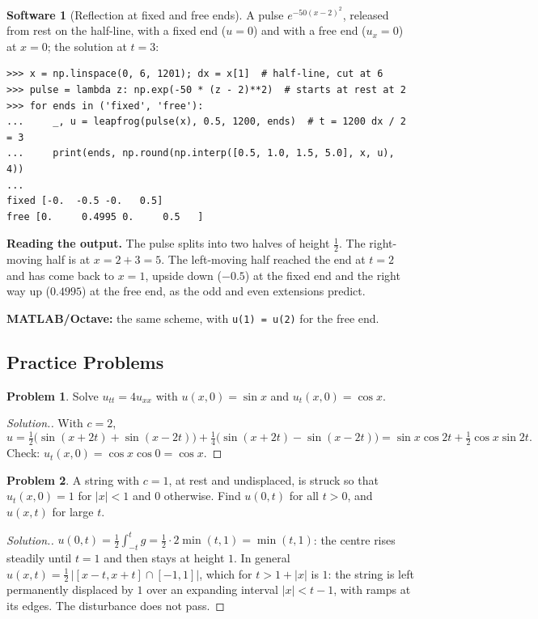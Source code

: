 \documentclass[11pt,a4paper]{article}
\numberwithin{equation}{section}
\theoremstyle{definition}
\newtheorem{software}[thm]{Software}
\newtheorem{problemx}{Problem}[subsection]
\newenvironment{problem}{\begin{problemx}}{\end{problemx}}
\newenvironment{solution}
  {\renewcommand{\qedsymbol}{}\begin{proof}[\textit{Solution}.]}
  {\end{proof}}
\begin{document}
\begin{software}[Reflection at fixed and free ends]
\label{sw:reflect}
A pulse $e^{-50(x - 2)^2}$, released from rest on the half-line, with a fixed end ($u = 0$) and with a free end ($u_x = 0$) at $x = 0$; the solution at $t = 3$:
{\small\begin{verbatim}
>>> x = np.linspace(0, 6, 1201); dx = x[1]  # half-line, cut at 6
>>> pulse = lambda z: np.exp(-50 * (z - 2)**2)  # starts at rest at 2
>>> for ends in ('fixed', 'free'):
...     _, u = leapfrog(pulse(x), 0.5, 1200, ends)  # t = 1200 dx / 2 = 3
...     print(ends, np.round(np.interp([0.5, 1.0, 1.5, 5.0], x, u), 4))
...
fixed [-0.  -0.5 -0.   0.5]
free [0.     0.4995 0.     0.5   ]
\end{verbatim}}
\textbf{Reading the output.} The pulse splits into two halves of height $\frac12$. The right-moving half is at $x = 2 + 3 = 5$. The left-moving half reached the end at $t = 2$ and has come back to $x = 1$, upside down ($-0.5$) at the fixed end and the right way up ($0.4995$) at the free end, as the odd and even
extensions predict.

\textbf{MATLAB/Octave:} the same scheme, with \texttt{u(1) = u(2)} for the free end.
\end{software}

\subsection{Practice Problems}

\begin{problem}
Solve $u_{tt} = 4u_{xx}$ with $u(x, 0) = \sin x$ and $u_t(x, 0) = \cos x$.
\end{problem}

\begin{solution}
With $c = 2$,
\[
u = \tfrac12\bigl(\sin(x + 2t) + \sin(x - 2t)\bigr) + \tfrac14\bigl(\sin(x + 2t) - \sin(x - 2t)\bigr) = \sin x\cos 2t + \tfrac12\cos x\sin 2t .
\]
Check: $u_t(x, 0) = \cos x\cos 0 = \cos x$.
\end{solution}

\begin{problem}
\label{prob:hammer}
A string with $c = 1$, at rest and undisplaced, is struck so that $u_t(x, 0) = 1$ for $|x| < 1$ and $0$ otherwise. Find $u(0, t)$ for all $t > 0$, and $u(x, t)$ for large $t$.
\end{problem}

\begin{solution}
$u(0, t) = \frac12\int_{-t}^tg = \frac12\cdot 2\min(t, 1) = \min(t, 1)$: the centre rises steadily until $t = 1$ and then stays at height $1$. In general $u(x, t) = \frac12\,\bigl|[x - t, x + t] \cap [-1, 1]\bigr|$, which for $t > 1 + |x|$ is $1$: the string is left permanently displaced by $1$ over an
expanding interval $|x| < t - 1$, with ramps at its edges. The disturbance does not pass.
\end{solution}
\end{document}
